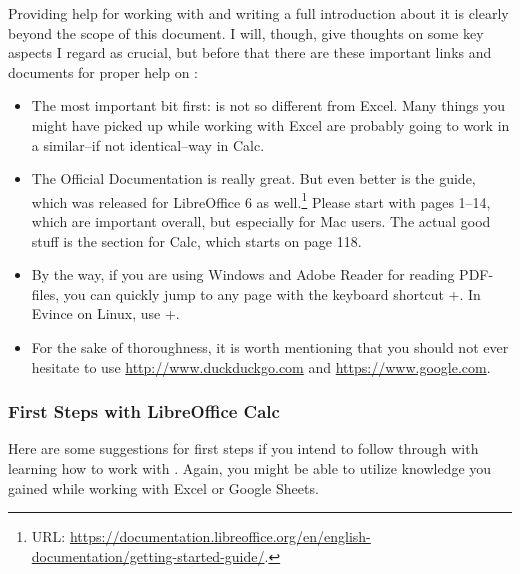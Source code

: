 Providing help for working with \loc and writing a full introduction about it is clearly beyond the scope of this document.
I will, though, give thoughts on some key aspects I regard as crucial, but before that there are these important links and documents for proper help on \loc:
\begin{itemize}
	\item The most important bit first: \loc is not so different from Excel.
	Many things you might have picked up while working with Excel are probably going to work in a similar--if not identical--way in Calc.
	\item The Official Documentation is really great.
	But even better is the  guide, which was released for LibreOffice 6 as well.\footnote{URL: \href{https://documentation.libreoffice.org/en/english-documentation/getting-started-guide/}{https://documentation.libreoffice.org/en/english-documentation/getting-started-guide/}.}
	Please start with pages 1--14, which are important overall, but especially for Mac users.
	The actual good stuff is the section for Calc, which starts on page 118.
	\item By the way, if you are using Windows and Adobe Reader for reading PDF-files, you can quickly jump to any page with the keyboard shortcut +.
	In Evince on Linux, use +.
	\item For the sake of thoroughness, it is worth mentioning that you should  not ever hesitate to use \href{http://www.duckduckgo.com}{http://www.duckduckgo.com} and  \href{https://www.google.com}{https://www.google.com}.
\end{itemize}

\subsubsection{First Steps with LibreOffice Calc}
\label{subsubsec:first-steps-with-libreoffice-calc}

Here are some suggestions for first steps if you intend to follow through with learning how to work with \loc.
Again, you might be able to utilize knowledge you gained while working with Excel or Google Sheets.

